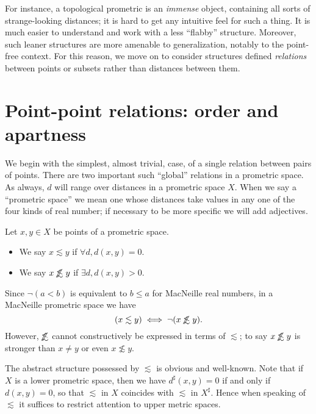 \documentclass{article}
\def\upp#1{{#1}^{\sharp}}
\def\oapt{\mathrel{\!\not\,\not\lesssim}}
\def\leapx{\lesssim}
\begin{document}
For instance, a topological prometric is an \emph{immense} object, containing all sorts of strange-looking distances; it is hard to get any intuitive feel for such a thing.
It is much easier to understand and work with a less ``flabby'' structure.
Moreover, such leaner structures are more amenable to generalization, notably to the point-free context.
For this reason, we move on to consider structures defined \emph{relations} between points or subsets rather than distances between them.


\section{Point-point relations: order and apartness}
\label{sec:point-point}
\label{sec:order}

We begin with the simplest, almost trivial, case, of a single relation between pairs of points.
There are two important such ``global'' relations in a prometric space.
As always, $d$ will range over distances in a prometric space $X$.
When we say a ``prometric space'' we mean one whose distances take values in any one of the four kinds of real number; if necessary to be more specific we will add adjectives.

\begin{defn}\label{def:promet-ord}
  Let $x,y\in X$ be points of a prometric space.
  \begin{itemize}
  \item We say $x\leapx y$ if $\forall d, d(x,y)=0$.
  \item We say $x\oapt y$ if $\exists d, d(x,y)>0$.
  \end{itemize}
\end{defn}

Since $\neg(a<b)$ is equivalent to $b\le a$ for MacNeille real numbers, in a MacNeille prometric space we have
\begin{equation}
  (x\leapx y) \iff \neg(x\oapt y).\label{eq:leapx-oapt}
\end{equation}
However, $\oapt$ cannot constructively be expressed in terms of $\leapx$; to say $x\oapt y$ is stronger than $x\neq y$ or even $x\not\leapx y$.

The abstract structure possessed by $\leapx$ is obvious and well-known.
Note that if $X$ is a lower prometric space, then we have $\upp{d}(x,y)=0$ if and only if $d(x,y)=0$, so that $\leapx$ in $X$ coincides with $\leapx$ in $\upp{X}$.
Hence when speaking of $\leapx$ it suffices to restrict attention to upper metric spaces.
\end{document}
